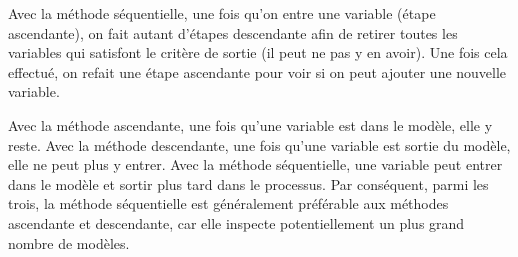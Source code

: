 \documentclass[
  11pt,
  letterpaper,
]{book}
\theoremstyle{definition}
\theoremstyle{remark}
\begin{document}
Avec la méthode séquentielle, une fois qu'on entre une variable (étape
ascendante), on fait autant d'étapes descendante afin de retirer toutes
les variables qui satisfont le critère de sortie (il peut ne pas y en
avoir). Une fois cela effectué, on refait une étape ascendante pour voir
si on peut ajouter une nouvelle variable.

Avec la méthode ascendante, une fois qu'une variable est dans le modèle,
elle y reste. Avec la méthode descendante, une fois qu'une variable est
sortie du modèle, elle ne peut plus y entrer. Avec la méthode
séquentielle, une variable peut entrer dans le modèle et sortir plus
tard dans le processus. Par conséquent, parmi les trois, la méthode
séquentielle est généralement préférable aux méthodes ascendante et
descendante, car elle inspecte potentiellement un plus grand nombre de
modèles.
\end{document}
